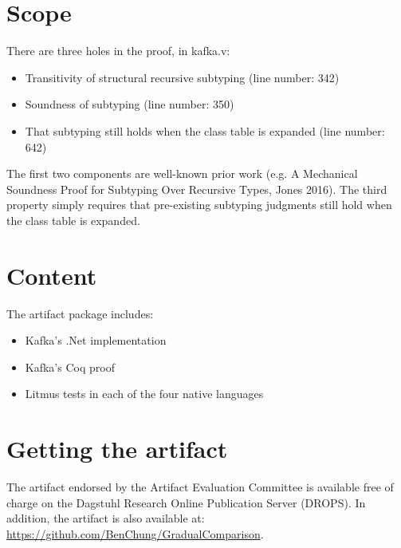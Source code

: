 \documentclass[a4paper,UKenglish]{darts-v2018}
\newenvironment{scope}{\section{Scope}}{}
\newenvironment{content}{\section{Content}}{}
\newenvironment{getting}{\section{Getting the artifact} The artifact 
endorsed by the Artifact Evaluation Committee is available free of 
charge on the Dagstuhl Research Online Publication Server (DROPS).}{}
\begin{document}
\begin{scope}


There are three holes in the proof, in kafka.v:
\begin{itemize}
	\item Transitivity of structural recursive subtyping (line number: 342)
	\item Soundness of subtyping (line number: 350)
	\item That subtyping still holds when the class table is expanded (line number: 642)
\end{itemize}

The first two components are well-known prior work (e.g. A Mechanical Soundness Proof for Subtyping Over Recursive Types, Jones 2016). 
The third property simply requires that pre-existing subtyping judgments still hold when the class table is expanded.
\end{scope}

\begin{content}
The artifact package includes:
\begin{itemize}
\item Kafka's .Net implementation
\item Kafka's Coq proof
\item Litmus tests in each of the four native languages
\end{itemize}
\end{content}

\begin{getting}
In addition, the artifact is also available at:
\url{https://github.com/BenChung/GradualComparison}.
\end{getting}
\end{document}
